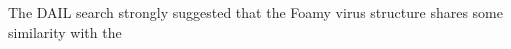 % 
The DAIL search strongly suggested that the Foamy virus structure shares some similarity with the
